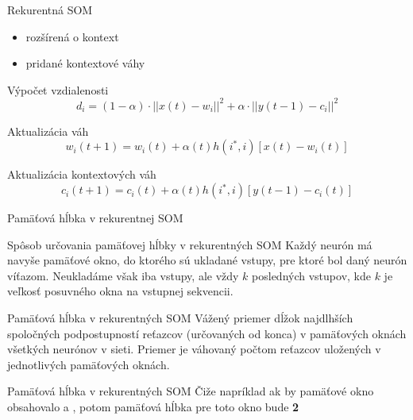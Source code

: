 \documentclass[10pt]{beamer}
\begin{document}
\begin{frame}[fragile]{Rekurentná SOM}
  \begin{itemize}
    \item rozšírená o kontext
    \item pridané kontextové váhy
  \end{itemize}
  
  Výpočet vzdialenosti
  \begin{equation*} 
    d_i = (1 - \alpha) \cdot ||x(t) - w_i||^{2} + \alpha \cdot ||y(t-1) - c_i||^{2} 
  \end{equation*}

  Aktualizácia váh
  \begin{equation*}
    w_i(t + 1) = w_i(t) + \alpha(t)h(i^*, i)[x(t) - w_i(t)]
  \end{equation*}

  Aktualizácia kontextových váh
  \begin{equation*}
    c_i(t + 1) = c_i(t) + \alpha(t)h(i^*, i)[y(t - 1) - c_i(t)]
  \end{equation*}
\end{frame}

\begin{frame}[fragile]{Pamäťová hĺbka v rekurentnej SOM}

  \begin{block}{Spôsob určovania pamäťovej hĺbky v rekurentných SOM}
    Každý neurón má navyše pamäťové okno, do ktorého sú ukladané vstupy, pre ktoré bol daný neurón víťazom.
    Neukladáme však iba vstupy, ale vždy $k$ posledných vstupov, kde $k$ je veľkosť posuvného okna na vstupnej sekvencii.
  \end{block}

  \begin{block}{Pamäťová hĺbka v rekurentných SOM}
    Vážený priemer dĺžok najdlhších spoločných podpostupností reťazcov (určovaných od konca) v pamäťových oknách všetkých neurónov v sieti.
    Priemer je váhovaný počtom reťazcov uložených v jednotlivých pamäťových oknách.
    
  \end{block}

  \begin{block}{Pamäťová hĺbka v rekurentných SOM}
    Čiže napríklad ak by pamäťové okno obsahovalo  a , potom pamäťová hĺbka pre toto okno bude \textbf{2}
  \end{block}
\end{frame}
\end{document}
